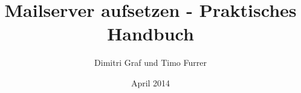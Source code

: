 \documentclass[12pt,titlepage]{article}
\begin{document}
\title{Mailserver aufsetzen - Praktisches Handbuch}
\author{Dimitri Graf und Timo Furrer}
\date{April 2014}
\maketitle

\tableofcontents
\newpage



\listoffigures
\end{document}
